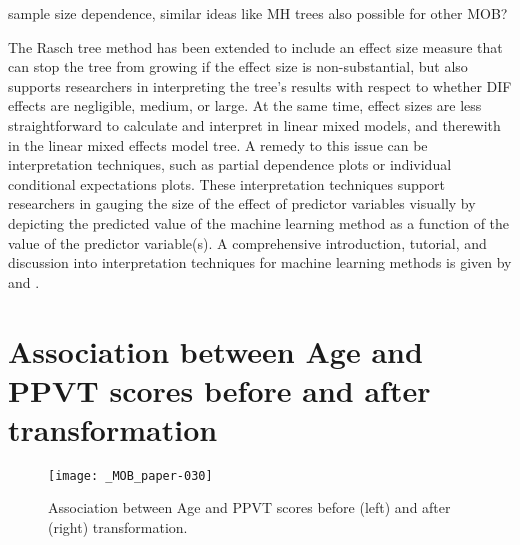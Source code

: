 \documentclass[doc,floatsintext,natbib]{apa7}
\begin{document}

sample size dependence, similar ideas like MH trees also possible for other MOB? 

The Rasch tree method has been extended to include an effect size measure that can stop the tree from growing if the effect size is non-substantial, but also supports researchers in interpreting the tree's results with respect to whether DIF effects are negligible, medium, or large. At the same time, effect sizes are less straightforward to calculate and interpret in linear mixed models, and therewith in the linear mixed effects model tree. A remedy to this issue can be interpretation techniques, such as partial dependence plots or individual conditional expectations plots. These interpretation techniques support researchers in gauging the size of the effect of predictor variables visually by depicting the predicted value of the machine learning method as a function of the value of the predictor variable(s). A comprehensive introduction, tutorial, and discussion into interpretation techniques for machine learning methods is given by \cite{Molnar2019} and \cite{Henninger2022c}. 







\newpage
\appendix



\section{Association between Age and PPVT scores before and after transformation}
\label{sec:AppendixA}


\begin{figure}[h!]
\caption{Association between Age and PPVT scores before (left) and after (right) transformation.}
\texttt{[image: \_MOB\_paper-030]}
\end{figure}
\end{document}
